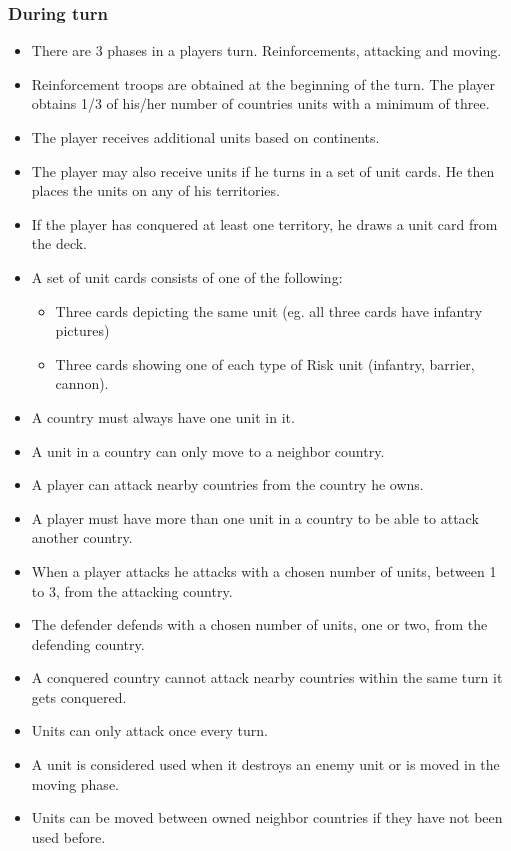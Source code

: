 \documentclass[12pt,a4paper]{article}
\begin{document}
\subsubsection{During turn}

\begin{itemize}
\item There are 3 phases in a players turn. Reinforcements, attacking
  and moving.
\item Reinforcement troops are obtained at the beginning of the turn. 
  The player obtains 1/3 of his/her number of countries units with a minimum 
  of three.
\item The player receives additional units based on continents.
\item The player may also receive units if he turns in a set of unit
  cards. He then places the units on any of his territories.
\item If the player has conquered at least one territory, he draws a
  unit card from the deck. 
\item A set of unit cards consists of one of the following:
  \begin{itemize}
  \item Three cards depicting the same unit (eg. all three cards have
    infantry pictures)
  \item Three cards showing one of each type of Risk unit (infantry,
    barrier, cannon).
  \end{itemize}
\item A country must always have one unit in it.
\item A unit in a country can only move to a neighbor country.
\item A player can attack nearby countries from the country he owns.
\item A player must have more than one unit in a country to be able to
  attack another country.
\item When a player attacks he attacks with a chosen number of units,
  between 1 to 3, from the attacking country.
\item The defender defends with a chosen number of units, one or two,
  from the defending country.
\item A conquered country cannot attack nearby countries within the
  same turn it gets conquered.
\item Units can only attack once every turn.
\item A unit is considered used when it destroys an enemy unit or is
  moved in the moving phase.
\item Units can be moved between owned neighbor countries if they 
  have not been used before.
\end{itemize}
\end{document}
